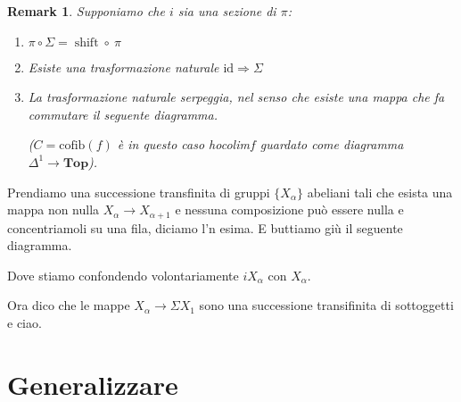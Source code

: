 \documentclass[12pt]{amsart}
\def\cate#1{\mathbf{#1}}
\newtheorem{rem}[theo]{Remark}
\newcommand\shift{\operatorname{shift}}
\begin{document}
\begin{rem}
Supponiamo che $i$ sia una sezione di $\pi$:
\begin{enumerate}
\item $\pi \circ \Sigma = \shift  \circ  \ \pi$
\item Esiste una trasformazione naturale $\text{id} \Rightarrow \Sigma$
\item La trasformazione naturale \emph{serpeggia}, nel senso che esiste una mappa che fa commutare il seguente diagramma.
\begin{center}
\end{center}
($C=\text{cofib}(f)$ è in questo caso hocolim$f$ guardato come diagramma $\Delta^1 \to \cate{Top}$).
\end{enumerate}
\end{rem}
\newpage
Prendiamo una successione transfinita di gruppi $\{X_{\alpha}\}$ abeliani tali che esista una mappa non nulla $X_\alpha \to X_{\alpha+1}$ e nessuna composizione può essere nulla e concentriamoli su una fila, diciamo l'n esima. E buttiamo giù il seguente diagramma.
\begin{center}
\end{center}
Dove stiamo confondendo volontariamente $iX_{\alpha}$ con $X_{\alpha}$.

Ora dico che le mappe $X_{\alpha} \to \Sigma X_1$ sono una successione transifinita di sottoggetti e ciao.

\section{Generalizzare}
\end{document}
